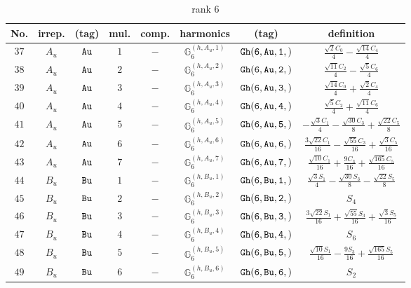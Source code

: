 \documentclass[fleqn,8pt]{jsarticle}
\begin{document}
\begin{table}[ht!]
\begin{center}
\caption{rank 6}
\renewcommand{\arraystretch}{1.3}
\begin{tabular}{cccccccc} \hline \hline
No. & irrep. & (tag) & mul. & comp. & harmonics & (tag) & definition \\ \hline
$ 37 $ & $ A_{u} $ & $ {\tt Au} $ & $ 1 $ & $ - $ & $ \mathbb{G}_{6}^{(h,A_{u},1)} $ & $ {\tt Gh(6,Au,1,)} $ & $ \frac{\sqrt{2} C_{0}}{4} - \frac{\sqrt{14} C_{4}}{4} $ \\
$ 38 $ & $ A_{u} $ & $ {\tt Au} $ & $ 2 $ & $ - $ & $ \mathbb{G}_{6}^{(h,A_{u},2)} $ & $ {\tt Gh(6,Au,2,)} $ & $ \frac{\sqrt{11} C_{2}}{4} - \frac{\sqrt{5} C_{6}}{4} $ \\
$ 39 $ & $ A_{u} $ & $ {\tt Au} $ & $ 3 $ & $ - $ & $ \mathbb{G}_{6}^{(h,A_{u},3)} $ & $ {\tt Gh(6,Au,3,)} $ & $ \frac{\sqrt{14} C_{0}}{4} + \frac{\sqrt{2} C_{4}}{4} $ \\
$ 40 $ & $ A_{u} $ & $ {\tt Au} $ & $ 4 $ & $ - $ & $ \mathbb{G}_{6}^{(h,A_{u},4)} $ & $ {\tt Gh(6,Au,4,)} $ & $ \frac{\sqrt{5} C_{2}}{4} + \frac{\sqrt{11} C_{6}}{4} $ \\
$ 41 $ & $ A_{u} $ & $ {\tt Au} $ & $ 5 $ & $ - $ & $ \mathbb{G}_{6}^{(h,A_{u},5)} $ & $ {\tt Gh(6,Au,5,)} $ & $ - \frac{\sqrt{3} C_{1}}{4} - \frac{\sqrt{30} C_{3}}{8} + \frac{\sqrt{22} C_{5}}{8} $ \\
$ 42 $ & $ A_{u} $ & $ {\tt Au} $ & $ 6 $ & $ - $ & $ \mathbb{G}_{6}^{(h,A_{u},6)} $ & $ {\tt Gh(6,Au,6,)} $ & $ \frac{3 \sqrt{22} C_{1}}{16} - \frac{\sqrt{55} C_{3}}{16} + \frac{\sqrt{3} C_{5}}{16} $ \\
$ 43 $ & $ A_{u} $ & $ {\tt Au} $ & $ 7 $ & $ - $ & $ \mathbb{G}_{6}^{(h,A_{u},7)} $ & $ {\tt Gh(6,Au,7,)} $ & $ \frac{\sqrt{10} C_{1}}{16} + \frac{9 C_{3}}{16} + \frac{\sqrt{165} C_{5}}{16} $ \\
$ 44 $ & $ B_{u} $ & $ {\tt Bu} $ & $ 1 $ & $ - $ & $ \mathbb{G}_{6}^{(h,B_{u},1)} $ & $ {\tt Gh(6,Bu,1,)} $ & $ \frac{\sqrt{3} S_{1}}{4} - \frac{\sqrt{30} S_{3}}{8} - \frac{\sqrt{22} S_{5}}{8} $ \\
$ 45 $ & $ B_{u} $ & $ {\tt Bu} $ & $ 2 $ & $ - $ & $ \mathbb{G}_{6}^{(h,B_{u},2)} $ & $ {\tt Gh(6,Bu,2,)} $ & $ S_{4} $ \\
$ 46 $ & $ B_{u} $ & $ {\tt Bu} $ & $ 3 $ & $ - $ & $ \mathbb{G}_{6}^{(h,B_{u},3)} $ & $ {\tt Gh(6,Bu,3,)} $ & $ \frac{3 \sqrt{22} S_{1}}{16} + \frac{\sqrt{55} S_{3}}{16} + \frac{\sqrt{3} S_{5}}{16} $ \\
$ 47 $ & $ B_{u} $ & $ {\tt Bu} $ & $ 4 $ & $ - $ & $ \mathbb{G}_{6}^{(h,B_{u},4)} $ & $ {\tt Gh(6,Bu,4,)} $ & $ S_{6} $ \\
$ 48 $ & $ B_{u} $ & $ {\tt Bu} $ & $ 5 $ & $ - $ & $ \mathbb{G}_{6}^{(h,B_{u},5)} $ & $ {\tt Gh(6,Bu,5,)} $ & $ \frac{\sqrt{10} S_{1}}{16} - \frac{9 S_{3}}{16} + \frac{\sqrt{165} S_{5}}{16} $ \\
$ 49 $ & $ B_{u} $ & $ {\tt Bu} $ & $ 6 $ & $ - $ & $ \mathbb{G}_{6}^{(h,B_{u},6)} $ & $ {\tt Gh(6,Bu,6,)} $ & $ S_{2} $ \\
 \hline \hline
\end{tabular}
\end{center}
\end{table}
\end{document}
